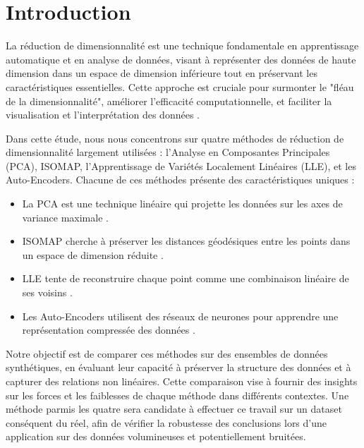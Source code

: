 \documentclass[unnumsec,webpdf,modern,large]{projet_manifold}%
\theoremstyle{thmstyleone}%
\theoremstyle{thmstyletwo}%
\theoremstyle{thmstylethree}%
\begin{document}
\maketitle


\section{Introduction}
La réduction de dimensionnalité est une technique fondamentale en apprentissage automatique et en analyse de données, visant à représenter des données de haute dimension dans un espace de dimension inférieure tout en préservant les caractéristiques essentielles. Cette approche est cruciale pour surmonter le "fléau de la dimensionnalité", améliorer l'efficacité computationnelle, et faciliter la visualisation et l'interprétation des données \cite{vandermaaten2009dimensionality}.

Dans cette étude, nous nous concentrons sur quatre méthodes de réduction de dimensionnalité largement utilisées : l'Analyse en Composantes Principales (PCA), ISOMAP, l'Apprentissage de Variétés Localement Linéaires (LLE), et les Auto-Encoders. Chacune de ces méthodes présente des caractéristiques uniques :

\begin{itemize}
    \item La PCA est une technique linéaire qui projette les données sur les axes de variance maximale \cite{jolliffe2002principal}.
    \item ISOMAP cherche à préserver les distances géodésiques entre les points dans un espace de dimension réduite \cite{tenenbaum2000global}.
    \item LLE tente de reconstruire chaque point comme une combinaison linéaire de ses voisins \cite{roweis2000nonlinear}.
    \item Les Auto-Encoders utilisent des réseaux de neurones pour apprendre une représentation compressée des données \cite{hinton2006reducing}.
\end{itemize}

Notre objectif est de comparer ces méthodes sur des ensembles de données synthétiques, en évaluant leur capacité à préserver la structure des données et à capturer des relations non linéaires. Cette comparaison vise à fournir des insights sur les forces et les faiblesses de chaque méthode dans différents contextes. Une méthode parmis les quatre sera candidate à effectuer ce travail sur un dataset conséquent du réel, afin de vérifier la robustesse des conclusions lors d'une application sur des données volumineuses et potentiellement bruitées.
\end{document}
